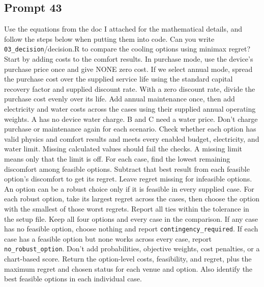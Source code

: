 \subsection*{Prompt 43}
Use the equations from the doc I attached for the mathematical details, and follow the steps below when putting them into code. Can you write \nolinkurl{03_decision}/decision.R to compare the cooling options using minimax regret? Start by adding costs to the comfort results. In purchase mode, use the device’s purchase price once and give NONE zero cost.
If we select annual mode, spread the purchase cost over the supplied service life using the standard capital recovery factor and supplied discount rate. With a zero discount rate, divide the purchase cost evenly over its life. Add annual maintenance once, then add electricity and water costs across the cases using their supplied annual operating weights. A has no device water charge. B and C need a water price. Don’t charge purchase or maintenance again for each scenario.
Check whether each option has valid physics and comfort results and meets every enabled budget, electricity, and water limit. Missing calculated values should fail the checks. A missing limit means only that the limit is off.
For each case, find the lowest remaining discomfort among feasible options. Subtract that best result from each feasible option’s discomfort to get its regret. Leave regret missing for infeasible options. An option can be a robust choice only if it is feasible in every supplied case. For each robust option, take its largest regret across the cases, then choose the option with the smallest of those worst regrets. Report all ties within the tolerance in the setup file.
Keep all four options and every case in the comparison. If any case has no feasible option, choose nothing and report \nolinkurl{contingency_required}. If each case has a feasible option but none works across every case, report \nolinkurl{no_robust_option}. Don’t add probabilities, objective weights, cost penalties, or a chart-based score.
Return the option-level costs, feasibility, and regret, plus the maximum regret and chosen status for each venue and option. Also identify the best feasible options in each individual case.

